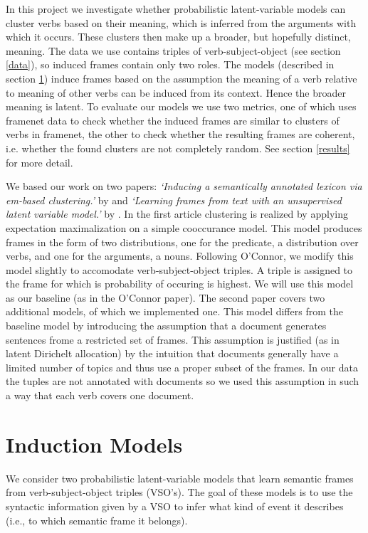 \documentclass{article} %
\begin{document}
In this project we investigate whether probabilistic latent-variable models can cluster verbs based on their meaning, which is inferred from the arguments with which it occurs. These clusters then make up a broader, but hopefully distinct, meaning. The data we use contains triples of verb-subject-object (see section \ref{data}), so induced frames contain only two roles. The models (described in section \ref{models}) induce frames based on the assumption the meaning of a verb relative to meaning of other verbs can be induced from its context. Hence the broader meaning is latent. To evaluate our models we use two metrics, one of which uses framenet data to check whether the induced frames are similar to clusters of verbs in framenet, the other to check whether the resulting frames are coherent, i.e. whether the found clusters are not completely random. See section \ref{results} for more detail.

We based our work on two papers: \textit{`Inducing a semantically annotated lexicon via em-based clustering.'} by \citeauthor{rooth1999} and \textit{`Learning frames from text with an unsupervised latent variable model.'} by \citeauthor{oconnor2013}. In the first article clustering is realized by applying expectation maximalization on a simple cooccurance model. This model produces frames in the form of two distributions, one for the predicate, a distribution over verbs, and one for the arguments, a nouns. Following O'Connor, we modify this model slightly to accomodate verb-subject-object triples. A triple is assigned to the frame for which is probability of occuring is highest. We will use this model as our baseline (as in the O'Connor paper). The second paper covers two additional models, of which we implemented one. This model differs from the baseline model by introducing the assumption that a document generates sentences frome a restricted set of frames. This assumption is justified (as in latent Dirichelt allocation) \cite{blei2003} by the intuition that documents generally have a limited number of topics and thus use a proper subset of the frames. In our data the tuples are not annotated with documents so we used this assumption in such a way that each verb covers one document.  


\section{Induction Models}
\label{models}
We consider two probabilistic latent-variable models that learn semantic frames
from verb-subject-object triples (VSO's).
The goal of these models is to use the syntactic information given by a VSO to
infer what kind of event it describes (i.e., to which semantic frame it belongs).
\end{document}
